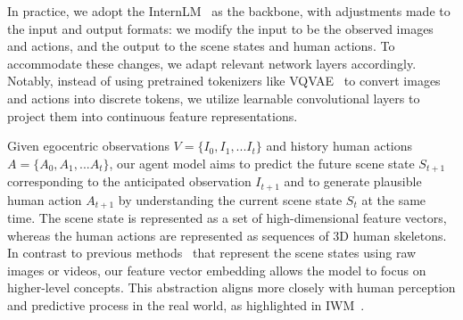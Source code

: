 In practice, we adopt the InternLM~\cite{team2023internlm} as the backbone,
with adjustments made to the input and output formats: we modify the input to be the observed images and actions, and the output to the scene states and human actions.
To accommodate these changes, we adapt relevant network layers accordingly.
Notably, instead of using pretrained tokenizers like VQVAE~\cite{van2017neural} to convert images and actions into discrete tokens, we utilize learnable convolutional layers to project them into continuous feature representations.

\vspace{1.5mm}
Given egocentric observations $V=\{I_0, I_1, ...I_t\}$ and history human actions $A=\{A_0, A_1, ...A_t\}$,
our agent model aims to predict the future scene state $S_{t+1}$ corresponding to the anticipated observation $I_{t+1}$ and to generate plausible human action $A_{t+1}$ by understanding the current scene state $S_t$ at the same time.
The scene state is represented as a set of high-dimensional feature vectors, whereas the human actions are represented as sequences of 3D human skeletons.
In contrast to previous methods~\cite{xiang2024pandora,bruce2024genie,yang2023learning} that represent the scene states using raw images or videos, our feature vector embedding allows the model to focus on higher-level concepts.
This abstraction aligns more closely with human perception and predictive process in the real world, as highlighted in IWM~\cite{garrido2024learning}.

